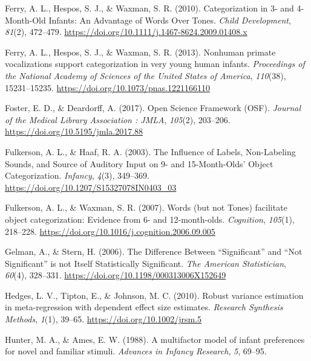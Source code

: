 \documentclass[
  man,mask,floatsintext]{apa6}
\newlength{\cslhangindent}
\newlength{\cslentryspacingunit} %
\newenvironment{CSLReferences}[2] %
 {%
  \setlength{\parindent}{0pt}
  \ifodd #1
  \let\oldpar\par
  \def\par{\hangindent=\cslhangindent\oldpar}
  \fi
  \setlength{\parskip}{#2\cslentryspacingunit}
 }%
 {}
\begin{document}
\begin{CSLReferences}{1}{0}
\leavevmode{}%
Ferry, A. L., Hespos, S. J., \& Waxman, S. R. (2010). Categorization in 3- and 4-{Month}-{Old} {Infants}: {An} {Advantage} of {Words} {Over} {Tones}. \emph{Child Development}, \emph{81}(2), 472--479. \url{https://doi.org/10.1111/j.1467-8624.2009.01408.x}

\leavevmode{}%
Ferry, A. L., Hespos, S. J., \& Waxman, S. R. (2013). Nonhuman primate vocalizations support categorization in very young human infants. \emph{Proceedings of the National Academy of Sciences of the United States of America}, \emph{110}(38), 15231--15235. \url{https://doi.org/10.1073/pnas.1221166110}

\leavevmode{}%
Foster, E. D., \& Deardorff, A. (2017). Open {Science} {Framework} ({OSF}). \emph{Journal of the Medical Library Association : JMLA}, \emph{105}(2), 203--206. \url{https://doi.org/10.5195/jmla.2017.88}

\leavevmode{}%
Fulkerson, A. L., \& Haaf, R. A. (2003). The {Influence} of {Labels}, {Non}-{Labeling} {Sounds}, and {Source} of {Auditory} {Input} on 9- and 15-{Month}-{Olds}' {Object} {Categorization}. \emph{Infancy}, \emph{4}(3), 349--369. \url{https://doi.org/10.1207/S15327078IN0403_03}

\leavevmode{}%
Fulkerson, A. L., \& Waxman, S. R. (2007). Words (but not {Tones}) facilitate object categorization: {Evidence} from 6- and 12-month-olds. \emph{Cognition}, \emph{105}(1), 218--228. \url{https://doi.org/10.1016/j.cognition.2006.09.005}

\leavevmode{}%
Gelman, A., \& Stern, H. (2006). The {Difference} {Between} {``{Significant}''} and {``{Not} {Significant}''} is not {Itself} {Statistically} {Significant}. \emph{The American Statistician}, \emph{60}(4), 328--331. \url{https://doi.org/10.1198/000313006X152649}

\leavevmode{}%
Hedges, L. V., Tipton, E., \& Johnson, M. C. (2010). Robust variance estimation in meta-regression with dependent effect size estimates. \emph{Research Synthesis Methods}, \emph{1}(1), 39--65. \url{https://doi.org/10.1002/jrsm.5}

\leavevmode{}%
Hunter, M. A., \& Ames, E. W. (1988). A multifactor model of infant preferences for novel and familiar stimuli. \emph{Advances in Infancy Research}, \emph{5}, 69--95.


\end{CSLReferences}
\end{document}
